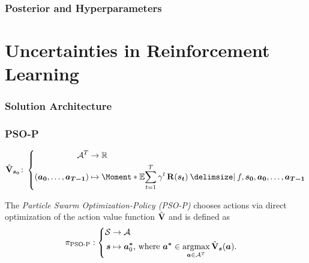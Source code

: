 \begin{frame}[label=gp_hyperparameters]
    \frametitle{Posterior and Hyperparameters}

    \centering
\end{frame}



\section{Uncertainties in Reinforcement Learning}
\begin{frame}[label=solution_architecture]
    \frametitle{Solution Architecture}

    \centering
    
\end{frame}

\begin{frame}[label=solution_psop]
    \frametitle{PSO-P}

    \begin{align}
        \label{eq:action_value_function}
        \AVlu_{\mat{s_0}} \colon \left\{
            \begin{aligned}
                \Ah^T &\to \R \\
                \left( \mat{a_0}, \dots, \mat{a_{T-1}} \right) &\mapsto \Moment*{\E}{\sum_{t=1}^T \gamma^t \Rwd(\mat{s_t}) \given f, \mat{s_0}, \mat{a_0}, \dots, \mat{a_{T-1}}}
            \end{aligned}
            \right.
        \end{align}

    \begin{definition}[PSO-P]
        \label{def:psop}
        The \emph{Particle Swarm Optimization-Policy (PSO-P)} chooses actions via direct optimization of the action value function $\operatorname{\hat{\operatorname{\mathbf{V}}}}$ and is defined as
        \begin{align}
            \pi_{\text{PSO-P}} &: \left\{
            \begin{aligned}
                \mathcal{S} &\to \mathcal{A}\\
                \bm{s} &\mapsto \bm{a^\ast}_0 \text{, where } \bm{a^\ast} \in \operatorname*{argmax}_{\bm{a} \in \mathcal{A}^T} \operatorname{\hat{\operatorname{\mathbf{V}}}}_{\bm{s}}(\bm{a}).
            \end{aligned}
            \right.
        \end{align}
    \end{definition}
\end{frame}

